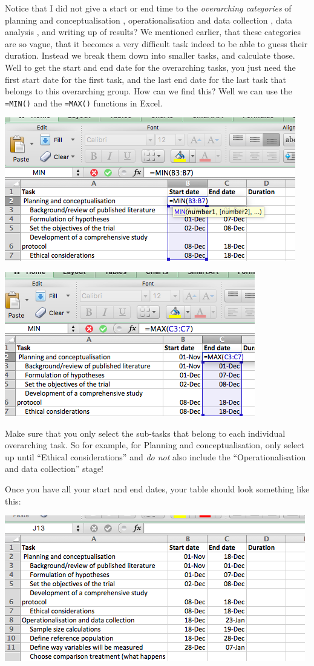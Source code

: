 \documentclass[
]{book}
\begin{document}
Notice that I did not give a start or end time to the \emph{overarching categories} of planning and conceptualisation
, operationalisation and data collection
, data analysis
, and writing up of results? We mentioned earlier, that these categories are so vague, that it becomes a very difficult task indeed to be able to guess their duration. Instead we break them down into smaller tasks, and calculate those. Well to get the start and end date for the overarching tasks, you just need the first start date for the first task, and the last end date for the last task that belongs to this overarching group. How can we find this? Well we can use the \texttt{=MIN()} and the \texttt{=MAX()} functions in Excel.

\includegraphics{imgs/ gantt_min.png}

\includegraphics{imgs/gantt_max.png}

Make sure that you only select the sub-tasks that belong to each individual overarching task. So for example, for Planning and conceptualisation, only select up until ``Ethical considerations'' and \emph{do not} also include the ``Operationalisation and data collection'' stage!

Once you have all your start and end dates, your table should look something like this:

\includegraphics{imgs/gantt_start_end.png}
\end{document}
